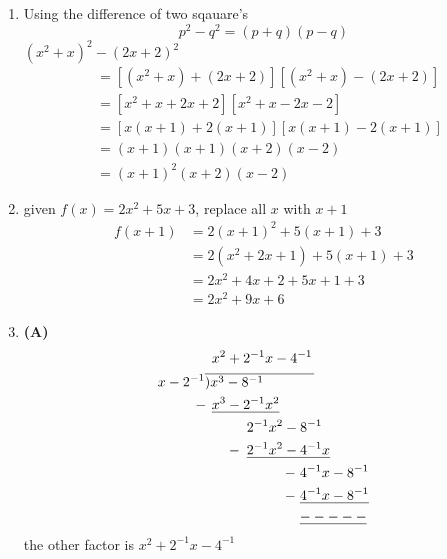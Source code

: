 \begin{multicols}{2}
\begin{enumerate}[label={\textbf{\arabic*.}}]
    \item Using the difference of two sqauare's \\
    $$p^2 - q^2 = (p + q)(p - q)$$
    $(x^2 +x)^2 - (2x + 2)^2$
    \begin{align*}
         &= \left[(x^2 + x) + (2x + 2)\right]\left[(x^2 +x ) - (2x + 2)\right] \\
         &= \left[x^2 + x + 2x + 2\right]\left[x^2 +x  -2x - 2\right] \\
         &= \left[x(x+ 1) + 2(x+ 1)\right]\left[x(x+1) -2(x+1)\right] \\
         & = (x+1)(x+1)(x+2)(x-2) \\
         & = (x+1)^2(x+2)(x-2)
    \end{align*}
    
    \item given $f(x) = 2x^2 + 5x + 3$, replace all $x$ with $x + 1$ 
     \begin{align*}
        f(x + 1) &= 2(x + 1)^2+ 5(x +1) + 3 \\
        & = 2(x^2 + 2x + 1) + 5(x + 1) + 3 \\
        & = 2x^2 + 4x + 2 + 5x + 1 + 3 \\
        & = 2x^2 + 9x + 6
     \end{align*}

    \item \textbf{(A)} \begin{align*} 
        & \hspace{5pt} x^ 2 + 2^{-1}x -4^{-1} \\ \vspace{-20pt} 
        x - 2^{-1}& \overline{)x^3 - 8^{-1} \hspace{.5in}} \\
        -\hspace{-1pt} & \hspace{5pt} \underline{x^3 - 2^{-1}x^2} \\
        & \hspace{30pt} 2^{-1}x^2 - 8^{-1} \\
        -\hspace{-25pt} & \hspace{30pt} \underline{2^{-1}x^2 - 4^{-1}x} \\
       -\hspace{-65pt} & \hspace{68pt} 4^{-1}x - 8^{-1} \\
       -\hspace{-65pt} & \hspace{68pt} \underline{4^{-1}x - 8^{-1} } \\
       & \hspace{68pt} \underline{-----} 
    \end{align*}
    the other factor is $x^ 2 + 2^{-1}x -4^{-1}$


\end{enumerate}
\end{multicols}
